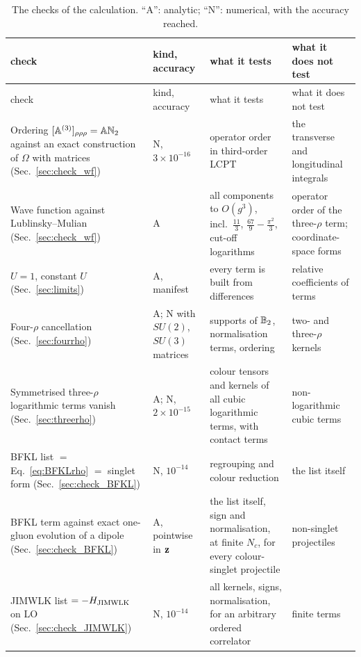 \begingroup
\footnotesize
\renewcommand{\arraystretch}{1.25}
\begin{longtable}{@{}>{\raggedright\arraybackslash}p{}>{\raggedright\arraybackslash}p{}>{\raggedright\arraybackslash}p{}>{\raggedright\arraybackslash}p{}@{}}
\caption{The checks of the calculation. ``A'': analytic; ``N'': numerical, with the accuracy reached.}\label{tab:checks}\\
\toprule
check & kind, accuracy & what it tests & what it does not test\\
\midrule
\endfirsthead
\toprule
check & kind, accuracy & what it tests & what it does not test\\
\midrule
\endhead
\bottomrule
\endfoot
Ordering $[\mathbb{A}^{(3)}]_{\rho\rho\rho}=\mathbb{A}\mathbb{N}_2$ against an exact construction of $\Omega$ with matrices (Sec.~\ref{sec:check_wf}) & N, $3\times10^{-16}$ & operator order in third-order LCPT & the transverse and longitudinal integrals\\
Wave function against Lublinsky--Mulian (Sec.~\ref{sec:check_wf}) & A & all components to $O(g^3)$, incl.\ $\frac{11}{3}$, $\frac{67}{9}-\frac{\pi^2}{3}$, cut-off logarithms & operator order of the three-$\rho$ term; coordinate-space forms\\
$U=1$, constant $U$ (Sec.~\ref{sec:limits}) & A, manifest & every term is built from differences & relative coefficients of terms\\
Four-$\rho$ cancellation (Sec.~\ref{sec:fourrho}) & A; N with $SU(2)$, $SU(3)$ matrices & supports of $\mathbb{B}_2$, normalisation terms, ordering & two- and three-$\rho$ kernels\\
Symmetrised three-$\rho$ logarithmic terms vanish (Sec.~\ref{sec:threerho}) & A; N, $2\times10^{-15}$ & colour tensors and kernels of all cubic logarithmic terms, with contact terms & non-logarithmic cubic terms\\
BFKL list $=$ Eq.~\eqref{eq:BFKLrho} $=$ singlet form (Sec.~\ref{sec:check_BFKL}) & N, $10^{-14}$ & regrouping and colour reduction & the list itself\\
BFKL term against exact one-gluon evolution of a dipole (Sec.~\ref{sec:check_BFKL}) & A, pointwise in $\mathbf{z}$ & the list itself, sign and normalisation, at finite $N_c$, for every colour-singlet projectile & non-singlet projectiles\\
JIMWLK list $=-H_{\rm JIMWLK}$ on LO (Sec.~\ref{sec:check_JIMWLK}) & N, $10^{-14}$ & all kernels, signs, normalisation, for an arbitrary ordered correlator & finite terms\\

\end{longtable}
